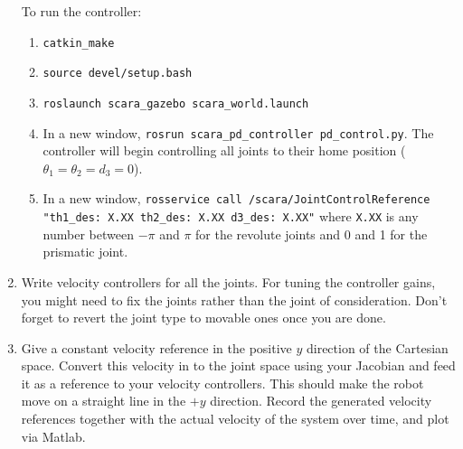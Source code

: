 \documentclass[10pt]{article}
\begin{document}
\begin{enumerate}
	To run the controller:
	
	\begin{enumerate}
		\item \texttt{catkin\_make}
		\item \texttt{source devel/setup.bash}
		\item \texttt{roslaunch scara\_gazebo scara\_world.launch}
		\item In a new window, \texttt{rosrun scara\_pd\_controller pd\_control.py}. The controller will begin controlling all joints to their home position ($\theta_1 = \theta_2 = d_3 = 0$).
		\item In a new window, \texttt{rosservice call /scara/JointControlReference "th1\_des: X.XX th2\_des: X.XX d3\_des: X.XX"} where \texttt{X.XX} is any number between $-\pi$ and $\pi$ for the revolute joints and 0 and 1 for the prismatic joint.
	\end{enumerate}
	
	\item Write velocity controllers for all the joints. For tuning the controller gains, you might need to fix the joints rather than the joint of consideration. Don't forget to revert the joint type to movable ones once you are done.
	
	\item Give a constant velocity reference in the positive $y$ direction of the Cartesian space. Convert this velocity in to the joint space using your Jacobian and feed it as a reference to your velocity controllers. This should make the robot move on a straight line in the $+y$ direction. Record the generated velocity references together with the actual velocity of the system over time, and plot via Matlab.
	
\end{enumerate}
\end{document}
